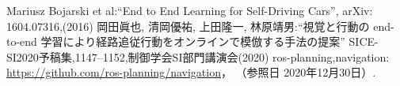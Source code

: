 \documentclass[10pt]{jarticle}
\begin{document}
    {\footnotesize
        \begin{thebibliography}{99}
            
            
            Mariusz Bojarski et al:``End to End Learning for Self-Driving Cars'',
            arXiv: 1604.07316,(2016)
            岡田眞也, 清岡優祐, 上田隆一, 林原靖男:``視覚と行動の end-to-end 
            学習により経路追従行動をオンラインで模倣する手法の提案''
            SICE-SI2020予稿集,1147--1152,制御学会SI部門講演会(2020)
            ros-planning,navigation:
            \url{https://github.com/ros-planning/navigation}， 
            （参照日 2020年12月30日）. 
            
            
        \end{thebibliography}
    }
   
        
   
    \vspace{5truemm}
    
    \normalsize
    
\end{document}
